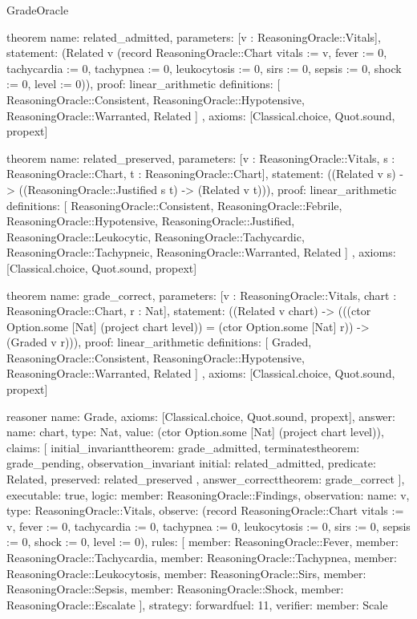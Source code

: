 \begin{lexlean}{GradeOracle}
\begin{semanticmodule}
theorem{
  name: related_admitted,
  parameters: [v : ReasoningOracle::Vitals],
  statement: (Related v (record ReasoningOracle::Chart {vitals := v, fever := 0, tachycardia := 0, tachypnea := 0, leukocytosis := 0, sirs := 0, sepsis := 0, shock := 0, level := 0})),
  proof: linear_arithmetic{
    definitions: [
      ReasoningOracle::Consistent,
      ReasoningOracle::Hypotensive,
      ReasoningOracle::Warranted,
      Related
    ]
  },
  axioms: [Classical.choice, Quot.sound, propext]
}

theorem{
  name: related_preserved,
  parameters: [v : ReasoningOracle::Vitals, s : ReasoningOracle::Chart, t : ReasoningOracle::Chart],
  statement: ((Related v s) -> ((ReasoningOracle::Justified s t) -> (Related v t))),
  proof: linear_arithmetic{
    definitions: [
      ReasoningOracle::Consistent,
      ReasoningOracle::Febrile,
      ReasoningOracle::Hypotensive,
      ReasoningOracle::Justified,
      ReasoningOracle::Leukocytic,
      ReasoningOracle::Tachycardic,
      ReasoningOracle::Tachypneic,
      ReasoningOracle::Warranted,
      Related
    ]
  },
  axioms: [Classical.choice, Quot.sound, propext]
}

theorem{
  name: grade_correct,
  parameters: [v : ReasoningOracle::Vitals, chart : ReasoningOracle::Chart, r : Nat],
  statement: ((Related v chart) -> (((ctor Option.some [Nat] (project chart level)) = (ctor Option.some [Nat] r)) -> (Graded v r))),
  proof: linear_arithmetic{
    definitions: [
      Graded,
      ReasoningOracle::Consistent,
      ReasoningOracle::Hypotensive,
      ReasoningOracle::Warranted,
      Related
    ]
  },
  axioms: [Classical.choice, Quot.sound, propext]
}

reasoner{
  name: Grade,
  axioms: [Classical.choice, Quot.sound, propext],
  answer: {name: chart, type: Nat, value: (ctor Option.some [Nat] (project chart level))},
  claims: [
    initial_invariant{theorem: grade_admitted},
    terminates{theorem: grade_pending},
    observation_invariant{
      initial: related_admitted,
      predicate: Related,
      preserved: related_preserved
    },
    answer_correct{theorem: grade_correct}
  ],
  executable: true,
  logic: {member: ReasoningOracle::Findings},
  observation: {name: v, type: ReasoningOracle::Vitals},
  observe: (record ReasoningOracle::Chart {vitals := v, fever := 0, tachycardia := 0, tachypnea := 0, leukocytosis := 0, sirs := 0, sepsis := 0, shock := 0, level := 0}),
  rules: [
    {member: ReasoningOracle::Fever},
    {member: ReasoningOracle::Tachycardia},
    {member: ReasoningOracle::Tachypnea},
    {member: ReasoningOracle::Leukocytosis},
    {member: ReasoningOracle::Sirs},
    {member: ReasoningOracle::Sepsis},
    {member: ReasoningOracle::Shock},
    {member: ReasoningOracle::Escalate}
  ],
  strategy: forward{fuel: 11},
  verifier: {member: Scale}
}
\end{semanticmodule}
\end{lexlean}
